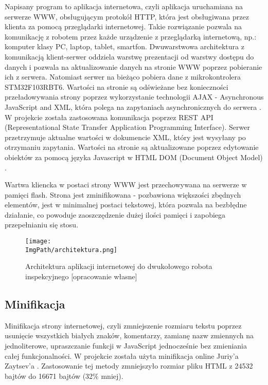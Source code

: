 \documentclass[a4paper,12pt,twoside,openany]{report}
\newcommand{\ImgPath}{.}
\begin{document}
Napisany program to aplikacja internetowa, czyli aplikacja uruchamiana na serwerze WWW, obsługującym protokół HTTP, która jest obsługiwana przez klienta za pomocą przeglądarki internetowej. Takie rozwiązanie pozwala na komunikację z robotem przez każde urządzenie z przeglądarką internetową, np.: komputer klasy PC, laptop, tablet, smartfon. Dwuwarstwowa architektura z komunikacją klient-serwer oddziela warstwę prezentacji od warstwy dostępu do danych i pozwala na aktualizowanie danych na stronie WWW poprzez pobieranie ich z serwera. Natomiast serwer na bieżąco pobiera dane z mikrokontrolera STM32F103RBT6. Wartości na stronie są odświeżane bez konieczności przeładowywania strony poprzez wykorzystanie technologii AJAX - Asynchronous JavaScript and XML, która polega na zapytaniach asynchronicznych do serwera \cite{ajax}. W projekcie została zastosowana komunikacja poprzez REST API (Representational State Transfer Application Programming Interface). Serwer przetrzymuje aktualne wartości w dokumencie XML, który jest wysyłany po otrzymaniu zapytania. Wartości na stronie są aktualizowane poprzez edytowanie obiektów za pomocą języka Javascript w HTML DOM (Document Object Model) \cite{dom}.

Wartwa kliencka w postaci strony WWW jest przechowywana na serwerze w pamięci flash. Strona jest zminifikowana - pozbawiona większości zbędnych elementów, jest w minimalnej postaci tekstowej, która pozwala na bezbłędne działanie, co powoduje zaoszczędzenie dużej ilości pamięci i zapobiega przepełnianiu się stosu.

\begin{figure}[!htbp]
	\begin{center}
\centering
\texttt{[image: \\ImgPath/architektura.png]}
\end{center}
	\caption{Architektura aplikacji internetowej do dwukołowego robota inspekcyjnego [opracowanie własne]}
	\label{schematKomunikacji}
\end{figure}

\newpage

\subsection{Minifikacja}

Minifikacja strony internetowej, czyli zmniejszenie rozmiaru tekstu poprzez usunięcie wszystkich białych znaków, komentarzy, zamianę nazw zmiennych na jednoliterowe, upraszczanie funkcji w JavaScript jednocześnie bez zmieniania całej funkcjonalności. W projekcie została użyta minifikacja online Juriy'a Zaytsev'a \cite{minifikacja}. Zastosowanie tej metody zmniejszyło rozmiar pliku HTML z 24532 bajtów do 16671 bajtów (32\% mniej).
\end{document}
